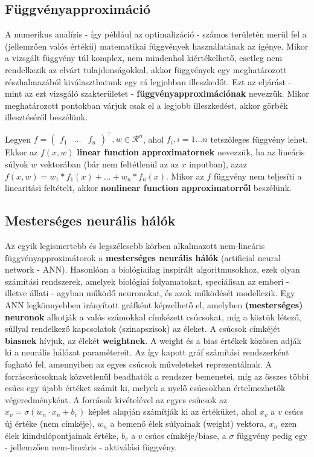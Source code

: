 \subsection{Függvényapproximáció}

A numerikus analízis - így például az optimalizáció - számos területén merül fel a (jellemzően valós értékű) matematikai függvények használatának az igénye. Mikor a vizsgált függvény túl komplex, nem mindenhol kiértékelhető, esetleg nem rendelkezik az elvárt tulajdonságokkal, akkor függvények egy meghatározott részhalmazából kiválaszthatunk egy rá legjobban illeszkedőt. Ezt az eljárást - mint az ezt vizsgáló szakterületet - \textbf{függvényapproximációnak} nevezzük. Mikor meghatározott pontokban várjuk csak el a legjobb illeszkedést, akkor görbék illesztéséről beszélünk.


Legyen $f = \left(\begin{smallmatrix}f_1 & \ldots & f_n\end{smallmatrix}\right)^\top, w \in \mathcal{R}^n$, ahol $f_i, i=1 \ldots n$ tetszőleges függvény lehet. Ekkor az $f(x, w)$ \textbf{linear function approximatornek} nevezzük, ha az lineáris súlyok $w$ vektorában (bár nem feltétlenül az az $x$ inputban), azaz $f(x,w) = w_1*f_1(x) + \ldots + w_n*f_n(x)$. Mikor az $f$ függvény nem teljesíti a linearitási feltételt, akkor \textbf{nonlinear function approximatorről} beszélünk.

\subsection{Mesterséges neurális hálók}

Az egyik legismertebb és legszélesebb körben alkalmazott nem-lineáris függvényapproximátorok a \textbf{mesterséges neurális hálók} (artificial neural network - ANN). Hasonlóan a biológiailag inspirált algoritmusokhoz, ezek olyan számítási rendszerek, amelyek biológiai folyamatokat, speciálisan az emberi - illetve állati - agyban működő neuronokat, és azok működését modellezik. Egy ANN legkönnyebben irányított gráfként képzelhető el, amelyben \textbf{(mesterséges) neuronok} alkotják a valós számokkal címkézett csúcsokat, míg a köztük létező, súllyal rendelkező kapcsolatok (szinapszisok) az éleket. A csúcsok címkéjét \textbf{biasnek} hívjuk, az élekét \textbf{weightnek}. A weight és a bias értékek közösen adják ki a neurális hálózat paramétereit. Az így kapott gráf számítási rendszerként fogható fel, amennyiben az egyes csúcsok műveleteket reprezentálnak. A forráscsúcsoknak közvetlenül beadhatók a rendszer bemenetei, míg az összes többi csúcs egy újabb értéket számít ki, melyek a nyelő csúcsokban értelmezhetők végeredményként. A források kivételével az egyes csúcsok az $x_v=\sigma(w_n \cdot x_n +b_v)$ képlet alapján számítják ki az értéküket, ahol $x_v$ a $v$ csúcs új értéke (nem címkéje), $w_n$ a bemenő élek súlyainak (weight) vektora, $x_n$ ezen élek kiindulópontjainak értéke, $b_v$ a $v$ csúcs címkéje/biase, a $\sigma$ függvény pedig egy - jellemzően nem-lineáris - aktiválási függvény.

